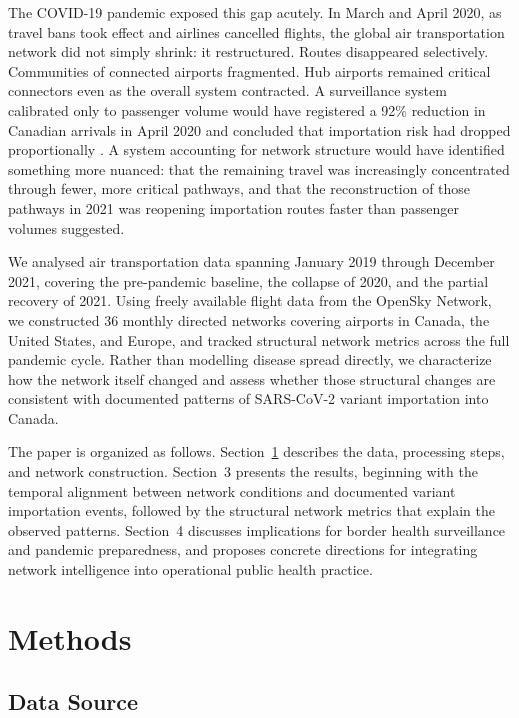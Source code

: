 \documentclass{elsarticle}
\begin{document}
The COVID-19 pandemic exposed this gap acutely. In March and April 2020, as travel bans took effect and airlines cancelled flights, the global air transportation network did not simply shrink: it restructured. Routes disappeared selectively. Communities of connected airports fragmented. Hub airports remained critical connectors even as the overall system contracted. A surveillance system calibrated only to passenger volume would have registered a 92\% reduction in Canadian arrivals in April 2020 and concluded that importation risk had dropped proportionally \cite{StatisticsCanada_2026}. A system accounting for network structure would have identified something more nuanced: that the remaining travel was increasingly concentrated through fewer, more critical pathways, and that the reconstruction of those pathways in 2021 was reopening importation routes faster than passenger volumes suggested.

We analysed air transportation data spanning January 2019 through December 2021, covering the pre-pandemic baseline, the collapse of 2020, and the partial recovery of 2021. Using freely available flight data from the OpenSky Network, we constructed 36 monthly directed networks covering airports in Canada, the United States, and Europe, and tracked structural network metrics across the full pandemic cycle. Rather than modelling disease spread directly, we characterize how the network itself changed and assess whether those structural changes are consistent with documented patterns of SARS-CoV-2 variant importation into Canada. 

The paper is organized as follows. Section~\ref{sec:methods} describes the data, processing steps, and network construction. Section~3 presents the results, beginning with the temporal alignment between network conditions and documented variant importation events, followed by the structural network metrics that explain the observed patterns. Section~4 discusses implications for border health surveillance and pandemic preparedness, and proposes concrete directions for integrating network intelligence into operational public health practice.

\section{Methods}\label{sec:methods}

\subsection{Data Source}\label{subsec:data_source}
\end{document}
